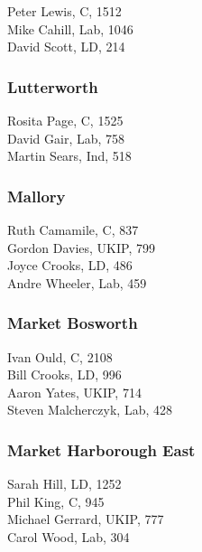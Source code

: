 \documentclass[a4paper,openany,10pt]{book}
\begin{document}


Peter Lewis, C, 1512\\
Mike Cahill, Lab, 1046\\
David Scott, LD, 214\\


\subsubsection*{Lutterworth}



Rosita Page, C, 1525\\
David Gair, Lab, 758\\
Martin Sears, Ind, 518\\


\subsubsection*{Mallory}



Ruth Camamile, C, 837\\
Gordon Davies, UKIP, 799\\
Joyce Crooks, LD, 486\\
Andre Wheeler, Lab, 459\\


\subsubsection*{Market Bosworth}



Ivan Ould, C, 2108\\
Bill Crooks, LD, 996\\
Aaron Yates, UKIP, 714\\
Steven Malcherczyk, Lab, 428\\


\subsubsection*{Market Harborough East}



Sarah Hill, LD, 1252\\
Phil King, C, 945\\
Michael Gerrard, UKIP, 777\\
Carol Wood, Lab, 304\\
\end{document}
